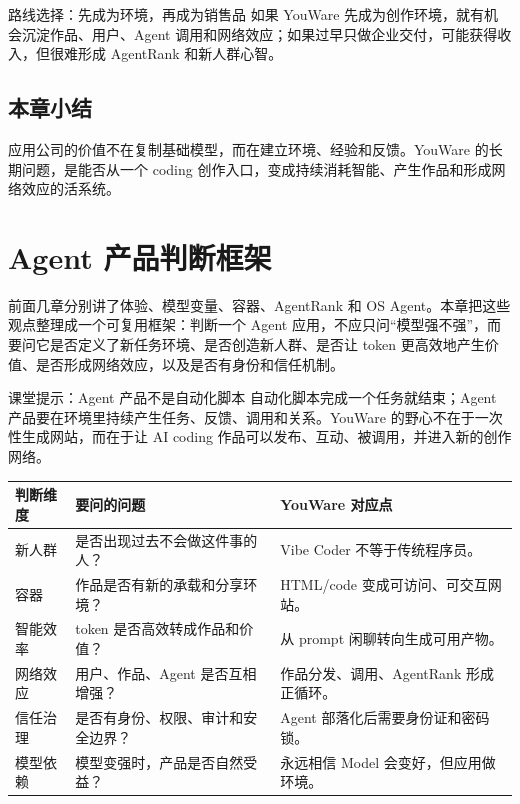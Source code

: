 \documentclass[a4paper]{article}
\begin{document}
\begin{importantbox}{路线选择：先成为环境，再成为销售品}
如果 YouWare 先成为创作环境，就有机会沉淀作品、用户、Agent 调用和网络效应；如果过早只做企业交付，可能获得收入，但很难形成 AgentRank 和新人群心智。
\end{importantbox}

\subsection{本章小结}

应用公司的价值不在复制基础模型，而在建立环境、经验和反馈。YouWare 的长期问题，是能否从一个 coding 创作入口，变成持续消耗智能、产生作品和形成网络效应的活系统。

\section{Agent 产品判断框架}

前面几章分别讲了体验、模型变量、容器、AgentRank 和 OS Agent。本章把这些观点整理成一个可复用框架：判断一个 Agent 应用，不应只问“模型强不强”，而要问它是否定义了新任务环境、是否创造新人群、是否让 token 更高效地产生价值、是否形成网络效应，以及是否有身份和信任机制。

\begin{knowledgebox}{课堂提示：Agent 产品不是自动化脚本}
自动化脚本完成一个任务就结束；Agent 产品要在环境里持续产生任务、反馈、调用和关系。YouWare 的野心不在于一次性生成网站，而在于让 AI coding 作品可以发布、互动、被调用，并进入新的创作网络。
\end{knowledgebox}

\noindent\begin{tabularx}{\textwidth}{p{}p{}X}
\toprule
判断维度 & 要问的问题 & YouWare 对应点 \\
\midrule
新人群 & 是否出现过去不会做这件事的人？ & Vibe Coder 不等于传统程序员。 \\
容器 & 作品是否有新的承载和分享环境？ & HTML/code 变成可访问、可交互网站。 \\
智能效率 & token 是否高效转成作品和价值？ & 从 prompt 闲聊转向生成可用产物。 \\
网络效应 & 用户、作品、Agent 是否互相增强？ & 作品分发、调用、AgentRank 形成正循环。 \\
信任治理 & 是否有身份、权限、审计和安全边界？ & Agent 部落化后需要身份证和密码锁。 \\
模型依赖 & 模型变强时，产品是否自然受益？ & 永远相信 Model 会变好，但应用做环境。 \\
\bottomrule
\end{tabularx}
\end{document}
